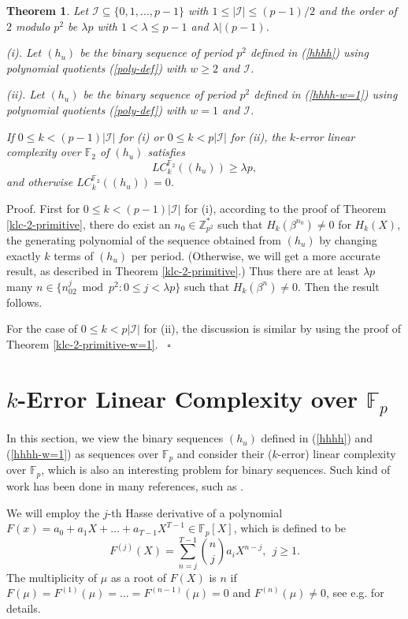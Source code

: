 \documentclass [11pt,a4paper]{article}
\def\F{\mathbb{F}}
\def\Z{\mathbb{Z}}
\newtheorem{theorem}{Theorem}
\begin{document}
\begin{theorem}\label{klc-2-general}
Let $\mathcal{I}\subseteq \{0,1,\ldots,p-1\}$ with $1\le |\mathcal{I}|\le (p-1)/2$ and the order of $2$ modulo $p^2$ be $\lambda p$ with $1<\lambda\le p-1$ and $\lambda|(p-1)$.

(i). Let $(h_u)$ be the binary sequence of period $p^{2}$ defined in (\ref{hhhh}) using polynomial quotients (\ref{poly-def}) with $w\ge 2$ and $\mathcal{I}$.

(ii). Let $(h_u)$ be the binary sequence of period $p^{2}$ defined in (\ref{hhhh-w=1})  using polynomial quotients (\ref{poly-def}) with $w=1$  and $\mathcal{I}$.

If $0\le k<(p-1)|\mathcal{I}|$ for (i) or $0\le k<p|\mathcal{I}|$ for (ii), the $k$-error linear complexity over $\F_2$ of $(h_u)$  satisfies
\[
 LC^{\F_2}_k((h_u))\ge \lambda p,
 \]
 and otherwise $LC^{\F_2}_k((h_u))=0$.
\end{theorem}
Proof. First for $0\le k<(p-1)|\mathcal{I}|$ for (i), according to the proof of Theorem \ref{klc-2-primitive}, there do exist an $n_0\in \Z_{p^2}^*$ such that
 $H_k(\beta^{n_0})\neq 0$ for $H_k(X)$, the generating polynomial of the sequence obtained from $(h_u)$ by changing exactly $k$ terms of $(h_u)$ per period. (Otherwise, we will get a more accurate result, as described in Theorem \ref{klc-2-primitive}.)
Thus there are at least $\lambda p$ many $n\in \{n_02^j \bmod {p^2} : 0\le j<\lambda p\}$ such that $H_k(\beta^{n})\neq 0$. Then the result follows.

For the case of  $0\le k<p|\mathcal{I}|$ for (ii), the discussion is similar by using  the proof of Theorem \ref{klc-2-primitive-w=1}. ~\hfill $\square$


\section{$k$-Error Linear Complexity over $\F_p$}\label{LC-p}

In this section, we view the binary sequences $(h_u)$ defined in  (\ref{hhhh}) and (\ref{hhhh-w=1}) as sequences over $\F_p$
and consider their ($k$-error) linear complexity over $\F_p$, which is also an interesting problem for binary sequences. Such kind of work has been done in many references, such as \cite{AM,AMW,AW06,AW,BW,CY,ESK,GLSW,HKN,HMMS}.

We will employ the $j$-th Hasse derivative of a polynomial $F(x)=a_0+a_1X+\ldots+a_{T-1}X^{T-1}\in\F_p[X]$, which is defined to be
$$
F^{(j)}(X)=\sum\limits_{n=j}^{T-1} \binom{n}{j}a_iX^{n-j}, ~~ j\ge 1.
$$
The multiplicity of $\mu$ as a root of $F(X)$ is $n$ if $F(\mu)=F^{(1)}(\mu)=\ldots =F^{(n-1)}(\mu)=0$ and $F^{(n)}(\mu)\neq 0$, see e.g. \cite[Ch 6.4]{LN} for details.
\end{document}
